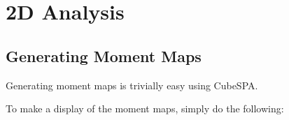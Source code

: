 \documentclass[letterpaper,10pt,english]{sphinxmanual}
\begin{document}
\begin{fulllineitems}

\begin{fulllineitems}
\label{\detokenize{getting_started:cubespa.cubespa.CubeSPA.velocities_from_wcs}}
\pysigstartsignatures
{}
\pysigstopsignatures
\end{fulllineitems}


\end{fulllineitems}


\begin{fulllineitems}
\label{\detokenize{getting_started:cubespa.cubespa.check_kwarg}}
\pysigstartsignatures
{}
\pysigstopsignatures
\end{fulllineitems}



\chapter{2D Analysis}
\label{\detokenize{index:d-analysis}}
\sphinxstepscope


\section{Generating Moment Maps}
\label{\detokenize{momentmaps:generating-moment-maps}}\label{\detokenize{momentmaps::doc}}
\sphinxAtStartPar
Generating moment maps is trivially easy using CubeSPA.

\sphinxAtStartPar
To make a display of the moment maps, simply do the following:

\begin{sphinxVerbatim}[commandchars=\\\{\}]
 
   
\end{sphinxVerbatim}
\end{document}
